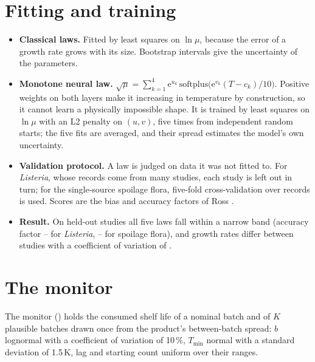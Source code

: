 \section{Fitting and training}\label{sec:train}
\begin{itemize}
\item \textbf{Classical laws.} Fitted by least squares on $\ln\mu$, because the error of a growth rate grows with its size. Bootstrap intervals give the uncertainty of the parameters.
\item \textbf{Monotone neural law.} $\sqrt{\mu}=\sum_{k=1}^{4}\mathrm e^{u_k}\,\mathrm{softplus}\big(\mathrm e^{v_k}(T-c_k)/10\big)$. Positive weights on both layers make it increasing in temperature by construction, so it cannot learn a physically impossible shape. It is trained by least squares on $\ln\mu$ with an L2 penalty on $(u,v)$, five times from independent random starts; the five fits are averaged, and their spread estimates the model's own uncertainty.
\item \textbf{Validation protocol.} A law is judged on data it was not fitted to. For \textit{Listeria}, whose records come from many studies, each study is left out in turn; for the single-source spoilage flora, five-fold cross-validation over records is used. Scores are the bias and accuracy factors of Ross \cite{ross1996}.
\item \textbf{Result.} On held-out studies all five laws fall within a narrow band (accuracy factor \GlLisArrAf--\GlLisSqrtAf{} for \textit{Listeria}, \GlSpSqrtAf--\GlSpQtenAf{} for spoilage flora), and growth rates differ between studies with a coefficient of variation of \GlCvB{} \cite{book}.
\end{itemize}

\section{The monitor}
The monitor () holds the consumed shelf life of a nominal batch and of $K$ plausible batches drawn once from the product's between-batch spread: $b$ lognormal with a coefficient of variation of 10\,\%, $T_{\min}$ normal with a standard deviation of 1.5\,K, lag and starting count uniform over their ranges.

